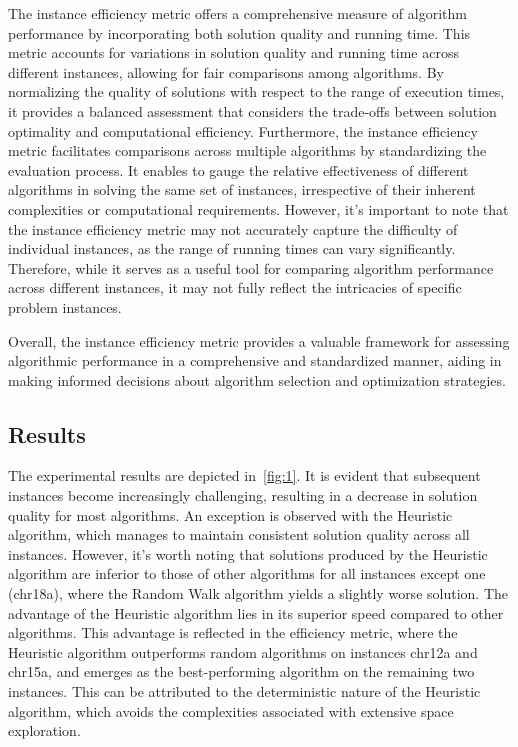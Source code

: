 The instance efficiency metric offers a comprehensive measure of algorithm performance by incorporating both solution quality and running time.
This metric accounts for variations in solution quality and running time across different instances, allowing for fair comparisons among algorithms.
By normalizing the quality of solutions with respect to the range of execution times,
it provides a balanced assessment that considers the trade-offs between solution optimality and computational efficiency.
Furthermore, the instance efficiency metric facilitates comparisons across multiple algorithms by standardizing the evaluation process.
It enables to gauge the relative effectiveness of different algorithms in solving the same set of instances,
irrespective of their inherent complexities or computational requirements.
However, it's important to note that the instance efficiency metric may not accurately capture the difficulty of individual instances,
as the range of running times can vary significantly.
Therefore, while it serves as a useful tool for comparing algorithm performance across different instances,
it may not fully reflect the intricacies of specific problem instances.

Overall, the instance efficiency metric provides a valuable framework for assessing algorithmic performance in a comprehensive and standardized manner,
aiding in making informed decisions about algorithm selection and optimization strategies.


\subsection{Results}\label{subsec:results}
The experimental results are depicted in~\ref{fig:1}.
It is evident that subsequent instances become increasingly challenging, resulting in a decrease in solution quality for most algorithms.
An exception is observed with the Heuristic algorithm, which manages to maintain consistent solution quality across all instances.
However, it's worth noting that solutions produced by the Heuristic algorithm are inferior to those of other algorithms for all instances except one (chr18a),
where the Random Walk algorithm yields a slightly worse solution.
The advantage of the Heuristic algorithm lies in its superior speed compared to other algorithms.
This advantage is reflected in the efficiency metric, where the Heuristic algorithm outperforms random algorithms on instances chr12a and chr15a,
and emerges as the best-performing algorithm on the remaining two instances.
This can be attributed to the deterministic nature of the Heuristic algorithm, which avoids the complexities associated with extensive space exploration.


